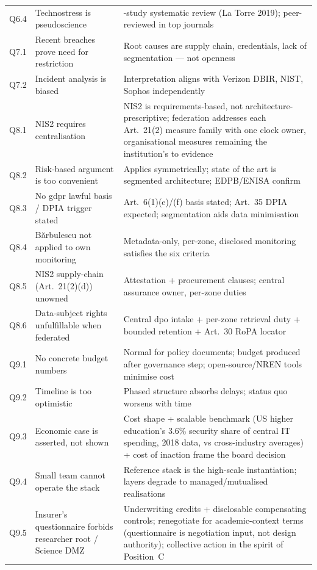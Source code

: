\begin{longtable}{>{\raggedright}p{1cm} >{\raggedright}p{5.5cm} >{\raggedright\arraybackslash}p{7.5cm}}
Q6.4 & Technostress is pseudoscience & 105-study systematic review (La Torre 2019); peer-reviewed in top journals \\
\addlinespace
Q7.1 & Recent breaches prove need for restriction & Root causes are supply chain, credentials, lack of segmentation --- not openness \\
\addlinespace
Q7.2 & Incident analysis is biased & Interpretation aligns with Verizon DBIR, NIST, Sophos independently \\
\addlinespace
Q8.1 & NIS2 requires centralisation & NIS2 is requirements-based, not architecture-prescriptive; federation addresses each Art.~21(2) measure family with one clock owner, organisational measures remaining the institution's to evidence \\
\addlinespace
Q8.2 & Risk-based argument is too convenient & Applies symmetrically; state of the art is segmented architecture; EDPB/ENISA confirm \\
Q8.3 & No \gls{gdpr} lawful basis / DPIA trigger stated & Art.~6(1)(e)/(f) basis stated; Art.~35 DPIA expected; segmentation aids data minimisation \\
Q8.4 & B\u{a}rbulescu not applied to own monitoring & Metadata-only, per-zone, disclosed monitoring satisfies the six criteria \\
Q8.5 & NIS2 supply-chain (Art.~21(2)(d)) unowned & Attestation + procurement clauses; central assurance owner, per-zone duties \\
Q8.6 & Data-subject rights unfulfillable when federated & Central \gls{dpo} intake + per-zone retrieval duty + bounded retention + Art.~30 RoPA locator \\
\addlinespace
Q9.1 & No concrete budget numbers & Normal for policy documents; budget produced after governance step; open-source/NREN tools minimise cost \\
\addlinespace
Q9.2 & Timeline is too optimistic & Phased structure absorbs delays; status quo worsens with time \\
\addlinespace
Q9.3 & Economic case is asserted, not shown & Cost shape + scalable benchmark (US higher education's 3.6\% security share of central IT spending, 2018 data, vs cross-industry averages) + cost of inaction frame the board decision \\
\addlinespace
Q9.4 & Small team cannot operate the stack & Reference stack is the high-scale instantiation; layers degrade to managed/mutualised realisations \\
\addlinespace
Q9.5 & Insurer's questionnaire forbids researcher root / Science DMZ & Underwriting credits + disclosable compensating controls; renegotiate for academic-context terms (questionnaire is negotiation input, not design authority); collective action in the spirit of Position~C \\

\end{longtable}
